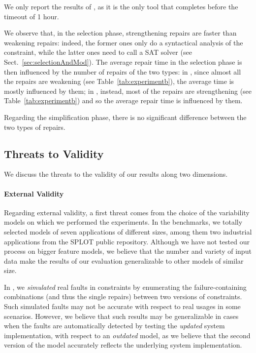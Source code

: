 \begin{tikzborder}{\cite{Gargantini16:validation}}
\begin{tikzborder}{\cite{gargantini_combinatorial_2017}}
\begin{tikzborder}{\cite{garn2019}}
\begin{tikzborder}{\cite{arcaini2019achieving}}
\begin{tikzborder}{\cite{arcaini2019varivolution}}
		\bb We only report the results of \espresso, as it is the only tool that completes before the timeout of 1 hour.
		
		We observe that, in the selection phase, strengthening repairs are faster than weakening repairs: indeed, the former ones only do a syntactical analysis of the constraint, while the latter ones need to call a SAT solver (see Sect.~\ref{sec:selectionAndMod}). The average repair time in the selection phase is then influenced by the number of repairs of the two types: in \erpSpl, since almost all the repairs are weakening (see Table~\ref{tab:experimentb}), the average time is mostly influenced by them; in \windows, instead, most of the repairs are strengthening (see Table~\ref{tab:experimentb}) and so the average repair time is influenced by them.
		
		Regarding the simplification phase, there is no significant difference between the two types of repairs.\be 
		
		\subsection{Threats to Validity}\label{sec:threats}
		\bb We discuss the threats to the validity of our results along two dimensions.
		
		\paragraph{External Validity}
		Regarding external validity, a first threat comes from the choice of the variability models on which we performed the experiments. In the benchmarks, we totally selected models of seven applications of different sizes, among them two industrial applications from the SPLOT public repository. Although we have not tested our process on bigger feature models, we believe that the number and variety of input data make the results of our evaluation generalizable to other models of similar size.
		
		In \benchReal, we \textit{simulated} real faults in constraints by enumerating the failure-containing combinations (and thus the single repairs) between two versions of constraints. Such simulated faults may not be accurate with respect to real usages in some scenarios. However, we believe that such results may be generalizable in cases when the faults are automatically detected by testing the \textit{updated} system implementation, with respect to an \textit{outdated} model, as we believe that the second version of the model accurately reflects the underlying system implementation.
		

\end{tikzborder}
\end{tikzborder}
\end{tikzborder}
\end{tikzborder}
\end{tikzborder}
